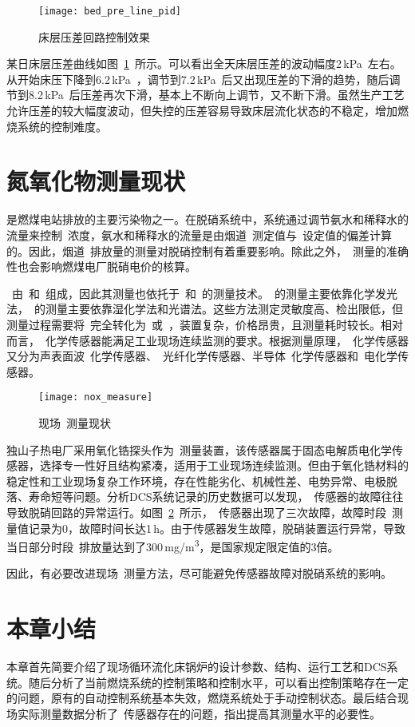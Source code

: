 \begin{figure}[hbtp]
\centering
\texttt{[image: bed\_pre\_line\_pid]}
\caption{床层压差回路控制效果} \label{fig:bed_pre_line_pid}
\end{figure}
 
某日床层压差曲线如图~\ref{fig:bed_pre_line_pid}~所示。可以看出全天床层压差的波动幅度2$\,$\si{\kilo\pascal}~左右。从开始床压下降到6.2$\,$\si{\kilo\pascal}~，调节到7.2$\,$\si{\kilo\pascal}~后又出现压差的下滑的趋势，随后调节到8.2$\,$\si{\kilo\pascal}~后压差再次下滑，基本上不断向上调节，又不断下滑。虽然生产工艺允许压差的较大幅度波动，但失控的压差容易导致床层流化状态的不稳定，增加燃烧系统的控制难度。


\section{氮氧化物测量现状}
\label{sec:nox_measure_now}
是燃煤电站排放的主要污染物之一。在脱硝系统中，系统通过调节氨水和稀释水的流量来控制~浓度，氨水和稀释水的流量是由烟道~测定值与~设定值的偏差计算的。因此，烟道~排放量的测量对脱硝控制有着重要影响。除此之外，~测量的准确性也会影响燃煤电厂脱硝电价的核算。


~由~和~组成，因此其测量也依托于~和~的测量技术。~的测量主要依靠化学发光法，~的测量主要依靠湿化学法和光谱法。这些方法测定灵敏度高、检出限低，但测量过程需要将~完全转化为~或~，装置复杂，价格昂贵，且测量耗时较长。相对而言，~化学传感器能满足工业现场连续监测的要求。根据测量原理，~化学传感器又分为声表面波~化学传感器、~光纤化学传感器、半导体~化学传感器和~电化学传感器\cite{王康丽2003氮氧化物化学传感器}。

\begin{figure}[hbtp]
\centering
\texttt{[image: nox\_measure]}
\caption{现场~测量现状} \label{fig:nox_measure}
\end{figure}

独山子热电厂采用氧化锆探头作为~测量装置，该传感器属于固态电解质电化学传感器，选择专一性好且结构紧凑，适用于工业现场连续监测。但由于氧化锆材料的稳定性和工业现场复杂工作环境，存在性能劣化、机械性差、电势异常、电极脱落、寿命短等问题\cite{罗顺安2010氧化锆}。分析DCS系统记录的历史数据可以发现，~传感器的故障往往导致脱硝回路的异常运行。如图~\ref{fig:nox_measure}~所示，~传感器出现了三次故障，故障时段~测量值记录为0，故障时间长达1$\,$\si{\hour}。由于传感器发生故障，脱硝装置运行异常，导致当日部分时段~排放量达到了300$\,$\si[per-mode=symbol]{\mg\per\m^3}，是国家规定限定值的3倍。


 
因此，有必要改进现场~测量方法，尽可能避免传感器故障对脱硝系统的影响。

\section{本章小结}
本章首先简要介绍了现场循环流化床锅炉的设计参数、结构、运行工艺和DCS系统。随后分析了当前燃烧系统的控制策略和控制水平，可以看出控制策略存在一定的问题，原有的自动控制系统基本失效，燃烧系统处于手动控制状态。最后结合现场实际测量数据分析了~传感器存在的问题，指出提高其测量水平的必要性。